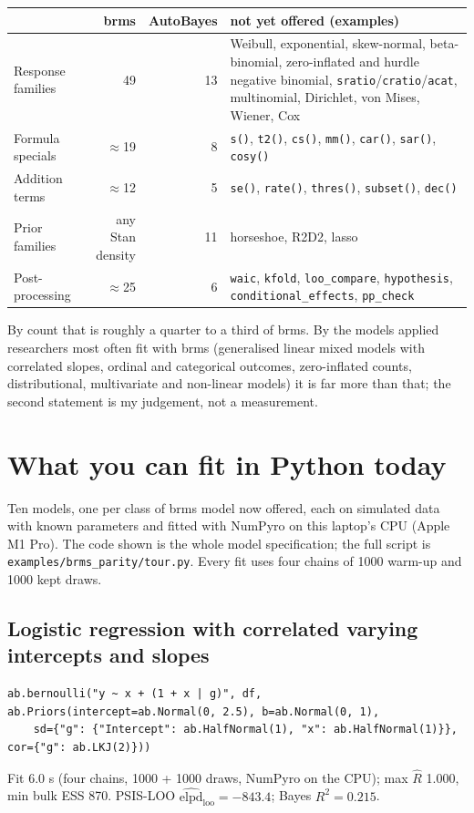 \documentclass[11pt]{article}
\newcommand{\code}[1]{\texttt{#1}}
\newcommand{\file}[1]{\texttt{#1}}
\begin{document}
\begin{center}\small
\begin{tabular}{@{}>{\raggedright\arraybackslash}p{}rr>{\raggedright\arraybackslash}p{}@{}}
\toprule
& brms & AutoBayes & not yet offered (examples) \\
\midrule
Response families & 49 & 13 & Weibull, exponential, skew-normal, beta-binomial, zero-inflated and hurdle negative binomial, \code{sratio}/\code{cratio}/\code{acat}, multinomial, Dirichlet, von Mises, Wiener, Cox \\
Formula specials & $\approx$19 & 8 & \code{s()}, \code{t2()}, \code{cs()}, \code{mm()}, \code{car()}, \code{sar()}, \code{cosy()} \\
Addition terms & $\approx$12 & 5 & \code{se()}, \code{rate()}, \code{thres()}, \code{subset()}, \code{dec()} \\
Prior families & any Stan density & 11 & horseshoe, R2D2, lasso \\
Post-processing & $\approx$25 & 6 & \code{waic}, \code{kfold}, \code{loo\_compare}, \code{hypothesis}, \code{conditional\_effects}, \code{pp\_check} \\
\bottomrule
\end{tabular}\end{center}

\noindent By count that is roughly a quarter to a third of brms. By the models applied researchers most often fit with
brms (generalised linear mixed models with correlated slopes, ordinal and categorical outcomes, zero-inflated counts,
distributional, multivariate and non-linear models) it is far more than that; the second statement is my judgement,
not a measurement.

\section{What you can fit in Python today}
\label{sec:tour}

Ten models, one per class of brms model now offered, each on simulated data with known parameters and fitted with
NumPyro on this laptop's CPU (Apple M1 Pro). The code shown is the whole model specification; the full script is
\file{examples/brms\_parity/tour.py}. Every fit uses four chains of 1000 warm-up and 1000 kept draws.

\subsection*{Logistic regression with correlated varying intercepts and slopes}
\begin{lstlisting}
ab.bernoulli("y ~ x + (1 + x | g)", df, ab.Priors(intercept=ab.Normal(0, 2.5), b=ab.Normal(0, 1),
    sd={"g": {"Intercept": ab.HalfNormal(1), "x": ab.HalfNormal(1)}}, cor={"g": ab.LKJ(2)}))
\end{lstlisting}
\noindent\small Fit 6.0 s (four chains, 1000 + 1000 draws, NumPyro on the CPU); max $\hat R$ 1.000, min bulk ESS 870. PSIS-LOO $\widehat{\mathrm{elpd}}_{\mathrm{loo}} = -843.4$; Bayes $R^2 = 0.215$.
\end{document}
